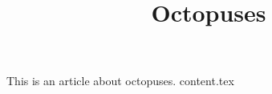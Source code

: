 \documentclass{article}
\title{Octopuses}
\begin{document}
\maketitle
This is an article about octopuses.
{content.tex}
\end{document}
